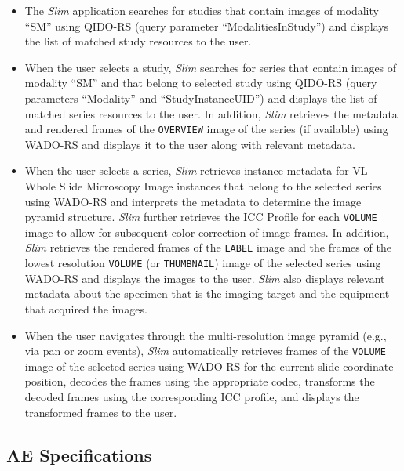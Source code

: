 \documentclass[12pt, letterpaper]{article}
\begin{document}
\begin{itemize}
    \item{%
            The \emph{Slim} application searches for studies that contain images of modality ``SM'' using \gls{QIDO-RS} (query parameter ``ModalitiesInStudy'') and displays the list of matched study resources to the user.
    }

    \item{%
        When the user selects a study, \emph{Slim} searches for series that contain images of modality ``SM'' and that belong to selected study using \gls{QIDO-RS} (query parameters ``Modality'' and ``StudyInstanceUID'') and displays the list of matched series resources to the user.
        In addition, \emph{Slim} retrieves the metadata and rendered frames of the \texttt{OVERVIEW} image of the series (if available) using \gls{WADO-RS} and displays it to the user along with relevant metadata.
    }

    \item{%
        When the user selects a series, \emph{Slim} retrieves instance metadata for VL Whole Slide Microscopy Image instances that belong to the selected series using \gls{WADO-RS} and interprets the metadata to determine the image pyramid structure.
        \emph{Slim} further retrieves the ICC Profile for each \texttt{VOLUME} image to allow for subsequent color correction of image frames.
        In addition, \emph{Slim} retrieves the rendered frames of the \texttt{LABEL} image and the frames of the lowest resolution \texttt{VOLUME} (or \texttt{THUMBNAIL}) image of the selected series using \gls{WADO-RS} and displays the images to the user.
        \emph{Slim} also displays relevant metadata about the specimen that is the imaging target and the equipment that acquired the images.
    }

    \item{%
        When the user navigates through the multi-resolution image pyramid (e.g., via pan or zoom events), \emph{Slim} automatically retrieves frames of the \texttt{VOLUME} image of the selected series using \gls{WADO-RS} for the current slide coordinate position, decodes the frames using the appropriate codec, transforms the decoded frames using the corresponding ICC profile, and displays the transformed frames to the user.
    }
\end{itemize}

\subsection{AE Specifications}
\end{document}
